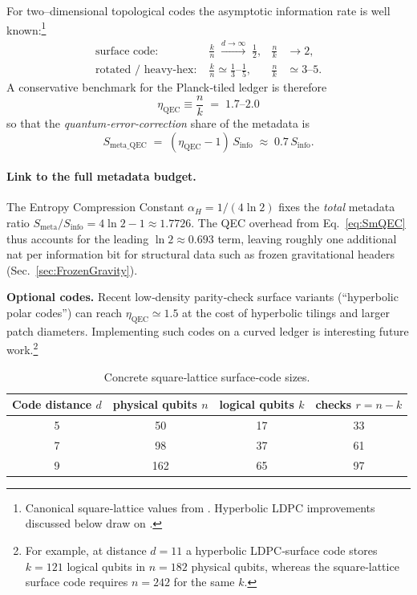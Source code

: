 \documentclass[a4paper, 12pt, oneside]{book}
\numberwithin{equation}{chapter}
\begin{document}
For two–dimensional topological codes the asymptotic information rate is
well known:\footnote{Canonical square‑lattice values from
\cite{Bravyi1998,Fowler2012}. Hyperbolic LDPC improvements discussed
below draw on \cite{Breuckmann2021}.}
\begin{align}
  \text{surface code:}\quad &\frac{k}{n}\;\xrightarrow{d\to\infty}\;\tfrac12,
  & \frac{n}{k}&\to 2,\\[4pt]
  \text{rotated / heavy-hex:}\;&\frac{k}{n}\simeq\tfrac13\text{--}\tfrac15,
  & \frac{n}{k}&\simeq3\text{--}5.\nonumber
\end{align}
A conservative benchmark for the Planck‑tiled ledger is therefore
\begin{equation}
  \boxed{\eta_{\mathrm{QEC}}\equiv\frac{n}{k}\;=\;1.7\text{--}2.0}
  \label{eq:etaQEC}
\end{equation}
so that the \emph{quantum‐error‐correction} share of the metadata is
\begin{equation}
  S_{\text{meta\_QEC}}
  \;=\;(\eta_{\mathrm{QEC}}-1)\,S_{\text{info}}
  \;\approx\;0.7\,S_{\text{info}}.
  \label{eq:SmQEC}
\end{equation}

\paragraph{Link to the full metadata budget.}
The Entropy Compression Constant
$\alpha_H=1/(4\ln2)$ fixes the \emph{total} metadata ratio
\mbox{$S_{\text{meta}}/S_{\text{info}} = 4\ln2 - 1 \approx 1.7726$}.  The
QEC overhead from Eq.~\eqref{eq:SmQEC} thus accounts for the leading
$\ln2\approx0.693$ term, leaving roughly one additional nat per
information bit for structural data such as frozen gravitational
headers (Sec.~\ref{sec:FrozenGravity}).

\medskip
\noindent\textbf{Optional codes.}  Recent low‑density parity‑check
surface variants (``hyperbolic polar codes'') can reach
$\eta_{\mathrm{QEC}}\!\simeq\!1.5$ at the cost of hyperbolic tilings and
larger patch diameters.  Implementing such codes on a curved ledger is
interesting future work.\footnote{For example, at distance $d\!=\!11$ a
hyperbolic LDPC‑surface code stores $k\!=\!121$ logical qubits in
$n\!=\!182$ physical qubits, whereas the square‑lattice surface code
requires $n\!=\!242$ for the same $k$.}

\begin{table}[h]
  \centering
  \caption{Concrete square‑lattice surface‑code sizes.}
  \vspace{-6pt}
  \begin{tabular}{@{}c|ccc@{}}
    \toprule
    Code distance $d$ & physical qubits $n$ & logical qubits $k$ & checks $r=n-k$ \\ \midrule
    5 & 50 & 17 & 33 \\
    7 & 98 & 37 & 61 \\
    9 & 162 & 65 & 97 \\ \bottomrule
  \end{tabular}
  \vspace{-4pt}
  \label{tab:surface_sizes}
\end{table}
\end{document}
